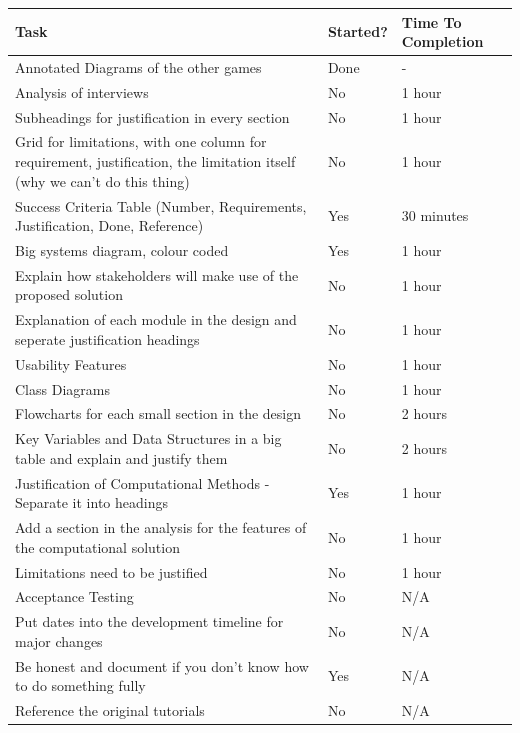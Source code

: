 \begin{center}
\begin{longtable}{|p{8cm}|p{2.5cm}|p{3.8cm}|}
    \hline
    Task & Started? & Time To Completion\\
    \hline
    \hline
    Annotated Diagrams of the other games & Done & -\\
    \hline
    Analysis of interviews & No & 1 hour\\
    \hline
    Subheadings for justification in every section & No & 1 hour\\
    \hline
    Grid for limitations, with one column for requirement, justification, the limitation itself (why we can't do this thing) & No & 1 hour\\
    \hline
    Success Criteria Table (Number, Requirements, Justification, Done, Reference) & Yes & 30 minutes\\
    \hline
    Big systems diagram, colour coded & Yes & 1 hour\\
    \hline 
    Explain how stakeholders will make use of the proposed solution & No & 1 hour\\
    \hline
    Explanation of each module in the design and seperate justification headings & No & 1 hour\\
    \hline
    Usability Features & No & 1 hour\\
    \hline
    Class Diagrams & No & 1 hour\\
    \hline 
    Flowcharts for each small section in the design & No & 2 hours\\
    \hline
    Key Variables and Data Structures in a big table and explain and justify them & No & 2 hours\\
    \hline 
    Justification of Computational Methods - Separate it into headings & Yes & 1 hour\\
    \hline
    Add a section in the analysis for the features of the computational solution & No & 1 hour\\
    \hline
    Limitations need to be justified & No & 1 hour\\
    \hline
    Acceptance Testing & No & N/A\\
    \hline
    Put dates into the development timeline for major changes & No & N/A\\
    \hline
    Be honest and document if you don't know how to do something fully & Yes & N/A\\
    \hline
    Reference the original tutorials & No & N/A\\
    \hline
\end{longtable}
\end{center}

